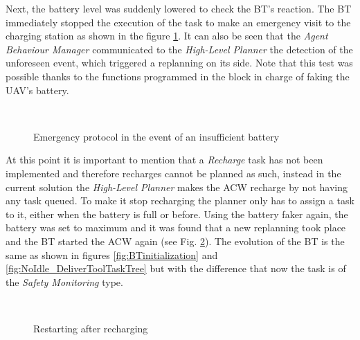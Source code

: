 Next, the battery level was suddenly lowered to check the \gls{BT}'s reaction. The \gls{BT} immediately stopped the execution of the task to make an emergency visit to the charging station as shown in the figure \ref{fig:event_battery}. It can also be seen that the \emph{Agent Behaviour Manager} communicated to the \emph{High-Level Planner} the detection of the unforeseen event, which triggered a replanning on its side. Note that this test was possible thanks to the functions programmed in the block in charge of faking the \gls{UAV}'s battery.

\begin{figure}[htbp]
    \centering
    \hfill
    \\
        \hfill
    \caption{Emergency protocol in the event of an insufficient battery}
    \label{fig:event_battery}
\end{figure}

At this point it is important to mention that a \emph{Recharge} task has not been implemented and therefore recharges cannot be planned as such, instead in the current solution the \emph{High-Level Planner} makes the \gls{ACW} recharge by not having any task queued. To make it stop recharging the planner only has to assign a task to it, either when the battery is full or before. Using the battery faker again, the battery was set to maximum and it was found that a new replanning took place and the \gls{BT} started the \gls{ACW} again (see Fig. \ref{fig:event_batteryOK}). The evolution of the \gls{BT} is the same as shown in figures \ref{fig:BTinitialization} and \ref{fig:NoIdle_DeliverToolTaskTree} but with the difference that now the task is of the \emph{Safety Monitoring} type.

\begin{figure}[htbp]
    \centering
    \hfill
    \\
        \hfill
    \caption{Restarting after recharging}
    \label{fig:event_batteryOK}
\end{figure}


